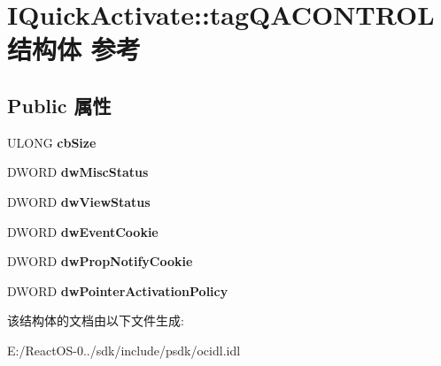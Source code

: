 \hypertarget{struct_i_quick_activate_1_1tag_q_a_c_o_n_t_r_o_l}{}\section{I\+Quick\+Activate\+:\+:tag\+Q\+A\+C\+O\+N\+T\+R\+O\+L结构体 参考}
\label{struct_i_quick_activate_1_1tag_q_a_c_o_n_t_r_o_l}
\subsection*{Public 属性}
\begin{DoxyCompactItemize}
\item 
\mbox{\label{struct_i_quick_activate_1_1tag_q_a_c_o_n_t_r_o_l_a2d224cb9cf924f3dfa6a1199bebe24d5}} 
U\+L\+O\+NG {\bfseries cb\+Size}
\item 
\mbox{\label{struct_i_quick_activate_1_1tag_q_a_c_o_n_t_r_o_l_a5355a4950cd4fcdecc88da382f6d74e7}} 
D\+W\+O\+RD {\bfseries dw\+Misc\+Status}
\item 
\mbox{\label{struct_i_quick_activate_1_1tag_q_a_c_o_n_t_r_o_l_a70142598760e4b24b81a7dc293361aab}} 
D\+W\+O\+RD {\bfseries dw\+View\+Status}
\item 
\mbox{\label{struct_i_quick_activate_1_1tag_q_a_c_o_n_t_r_o_l_a9f2b473341d881dd33e8c7cc3be376d0}} 
D\+W\+O\+RD {\bfseries dw\+Event\+Cookie}
\item 
\mbox{\label{struct_i_quick_activate_1_1tag_q_a_c_o_n_t_r_o_l_aaaab6666a84558e1df74300e7301106e}} 
D\+W\+O\+RD {\bfseries dw\+Prop\+Notify\+Cookie}
\item 
\mbox{\label{struct_i_quick_activate_1_1tag_q_a_c_o_n_t_r_o_l_a0b7a7997599dd37f7373a808c353cd65}} 
D\+W\+O\+RD {\bfseries dw\+Pointer\+Activation\+Policy}
\end{DoxyCompactItemize}


该结构体的文档由以下文件生成\+:\begin{DoxyCompactItemize}
\item 
E\+:/\+React\+O\+S-\/0../sdk/include/psdk/ocidl.\+idl\end{DoxyCompactItemize}
